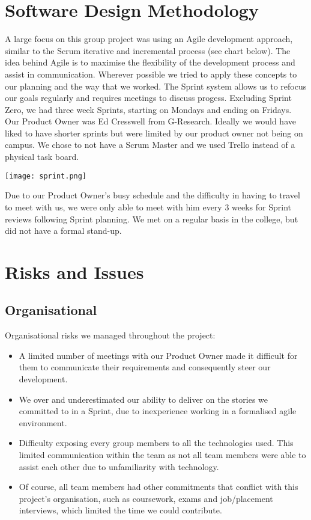 \section{Software Design Methodology}
A large focus on this group project was using an Agile development approach, similar to the Scrum iterative and incremental process (see chart below). The idea behind Agile is to maximise the flexibility of the development process and assist in communication. Wherever possible we tried to apply these concepts to our planning and the way that we worked. The Sprint system allows us to refocus our goals regularly and requires meetings to discuss progess. Excluding Sprint Zero, we had three week Sprints, starting on Mondays and ending on Fridays. Our Product Owner was Ed Cresswell from G-Research.  Ideally we would have liked to have shorter sprints but were limited by our product owner not being on campus. We chose to not have a Scrum Master and we used Trello instead of a physical task board.

\begin{center}
\texttt{[image: sprint.png]}
\end{center}

Due to our Product Owner's busy schedule and the difficulty in having to travel to meet with us, we were only able to meet with him every 3 weeks for Sprint reviews following Sprint planning. We met on a regular basis in the college, but did not have a formal stand-up.

\section{Risks and Issues}
\subsection{Organisational}
Organisational risks we managed throughout the project:
\begin{itemize}
\item A limited number of meetings with our Product Owner made it difficult for them to communicate their requirements and consequently steer our development.
\item We over and underestimated our ability to deliver on the stories we committed to in a Sprint, due to inexperience working in a formalised agile environment.
\item Difficulty exposing every group members to all the technologies used. This limited communication within the team as not all team members were able to assist each other due to unfamiliarity with technology.
\item Of course, all team members had other commitments that conflict with this project's organisation, such as coursework, exams and job/placement interviews, which limited the time we could contribute.
\end{itemize}

